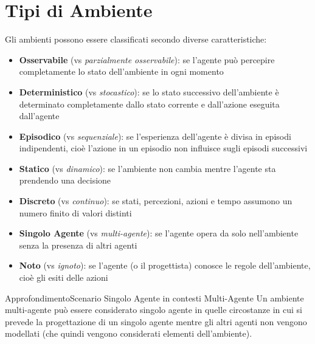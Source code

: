 \documentclass[a4paper, 11pt, oneside]{book}
\theoremstyle{definition}
\begin{document}
	\section{Tipi di Ambiente}
	Gli ambienti possono essere classificati secondo diverse caratteristiche:
	\begin{itemize}
		\item \textbf{Osservabile} (vs \emph{parzialmente osservabile}): se l'agente
			pu\`o percepire completamente lo stato dell'ambiente in ogni momento

		\item \textbf{Deterministico} (vs \emph{stocastico}): se lo stato successivo
			dell'ambiente \`e determinato completamente dallo stato corrente e dall'azione
			eseguita dall'agente

		\item \textbf{Episodico} (vs \emph{sequenziale}): se l'esperienza dell'agente
			\`e divisa in episodi indipendenti, cio\`e l'azione in un episodio non
			influisce sugli episodi successivi

		\item \textbf{Statico} (vs \emph{dinamico}): se l'ambiente non cambia mentre
			l'agente sta prendendo una decisione

		\item \textbf{Discreto} (vs \emph{continuo}): se stati, percezioni, azioni e
			tempo assumono un numero finito di valori distinti

		\item \textbf{Singolo Agente} (vs \emph{multi-agente}): se l'agente opera da
			solo nell'ambiente senza la presenza di altri agenti

		\item \textbf{Noto} (vs \emph{ignoto}): se l'agente (o il progettista)
			conosce le regole dell'ambiente, cio\`e gli esiti delle azioni
	\end{itemize}
	\begin{nota}
		{Approfondimento}{Scenario Singolo Agente in contesti Multi-Agente} Un
		ambiente multi-agente pu\`o essere considerato singolo agente in quelle
		circostanze in cui si prevede la progettazione di un singolo agente mentre
		gli altri agenti non vengono modellati (che quindi vengono considerati elementi
		dell'ambiente).
	\end{nota}
\end{document}
